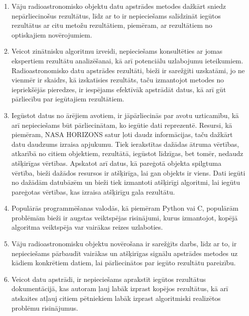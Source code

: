 \begin{enumerate}
    \item Vāju radioastronomisko objektu datu apstrādes metodes dažkārt sniedz nepārliecinošus rezultātus, līdz ar to ir nepieciešams salīdzināt iegūtos rezultātus ar citu metožu rezultātiem, piemēram, ar rezultātiem no optiskajiem novērojumiem.
    \item Veicot zinātnisku algoritmu izveidi, nepieciešams konsultēties ar jomas ekspertiem rezultātu analizēšanai, kā arī potenciālu uzlabojumu ieteikumiem. Radioastronomisko datu apstrādes rezultāti, bieži ir sarežģīti uzskatāmi, jo ne vienmēr ir skaidrs, kā izskatīsies rezultāts, taču izmantojot metodes no iepriekšējās pieredzes, ir iespējams efektīvāk apstrādāt datus, kā arī gūt pārliecību par iegūtajiem rezultātiem.   
    \item Iegūstot datus no ārējiem avotiem, ir jāpārliecinās par avotu uzticamību, kā arī nepieciešams būt pārliecinātam, ko iegūtie dati reprezentē. Resursi, kā piemēram, NASA HORIZONS satur ļoti daudz informācijas, taču dažkārt datu daudzums izraisa apjukumu. Tiek ierakstītas dažādas ātruma vērtības, atkarībā no citiem objektiem, rezultātā, iegūstot līdzīgas, bet tomēr, nedaudz atšķirīgas vērtības. Apskatot arī datus, kā pareģotā objekta spilgtuma vērtība, bieži dažādos resursos ir atšķirīga, lai gan objekts ir viens. Dati iegūti no dažādām datubāzēm un bieži tiek izmantoti atšķirīgi algoritmi, lai iegūtu pareģotas vērtības, kas izraisa atšķirīgu gala rezultātu.
    \item Populārās programmēšanas valodās, kā piemēram Python vai C, populārām problēmām bieži ir augstas veiktspējas risinājumi, kurus izmantojot, kopējā algoritma veiktspēja var vairākas reizes uzlaboties.
    \item Vāju radioastronomisku objektu novērošana ir sarežģīts darbs, līdz ar to, ir nepieciešams pārbaudīt vairākas un atšķirīgas signālu apstrādes metodes uz kādiem konkrētiem datiem, lai pārliecinātos par iegūto rezultātu pareizību.
    
    \item Veicot datu apstrādi, ir nepieciešams aprakstīt iegūtos rezultātus dokumentācijā, kas autoram ļauj labāk izprast kopējos rezultātus, kā arī atskaites atļauj citiem pētniekiem labāk izprast algoritmiski realizētos problēmu risinājumus.
    
    

    
\end{enumerate}

